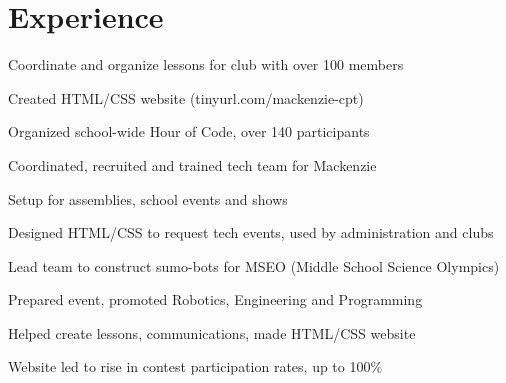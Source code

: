 \documentclass[]{deedy-resume-openfont}
\begin{document}
\begin{minipage}[t]{0.66\textwidth} 


\section{Experience}

\vspace{\topsep} %
\begin{tightemize}
\item Coordinate and organize lessons for club with over 100 members
\item Created HTML/CSS website (tinyurl.com/mackenzie-cpt)
\item Organized school-wide Hour of Code, over 140 participants
\end{tightemize}
\sectionsep

\begin{tightemize}
\item Coordinated, recruited and trained tech team for Mackenzie
\item Setup for assemblies, school events and shows
\item Designed HTML/CSS to request tech events, used by administration and clubs
\end{tightemize}
\sectionsep

\begin{tightemize}
\item Lead team to construct sumo-bots for MSEO (Middle School Science Olympics)
\item Prepared event, promoted Robotics, Engineering and Programming
\end{tightemize}
\sectionsep

\begin{tightemize}
\item Helped create lessons, communications, made HTML/CSS website
\item Website led to rise in contest participation rates, up to 100\%
\end{tightemize}
\sectionsep


\end{minipage}
\end{document}
